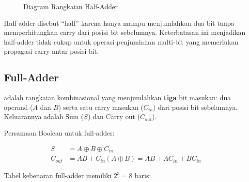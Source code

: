\begin{figure}[H]
\centering
{}
\caption{Diagram Rangkaian Half-Adder}
\label{fig:half-adder}
\end{figure}

Half-adder disebut ``half'' karena hanya mampu menjumlahkan dua bit tanpa memperhitungkan carry dari posisi bit sebelumnya. Keterbatasan ini menjadikan half-adder tidak cukup untuk operasi penjumlahan multi-bit yang memerlukan propagasi carry antar posisi bit.

\subsection{Full-Adder}

\begin{definisi}
 adalah rangkaian kombinasional yang menjumlahkan \textbf{tiga} bit masukan: dua operand ($A$ dan $B$) serta satu carry masukan ($C_{in}$) dari posisi bit sebelumnya. Keluarannya adalah Sum ($S$) dan Carry out ($C_{out}$).
\end{definisi}

Persamaan Boolean untuk full-adder:

\begin{align*}
S &= A \oplus B \oplus C_{in} \\
C_{out} &= AB + C_{in}(A \oplus B) = AB + AC_{in} + BC_{in}
\end{align*}

Tabel kebenaran full-adder memiliki $2^3 = 8$ baris:

